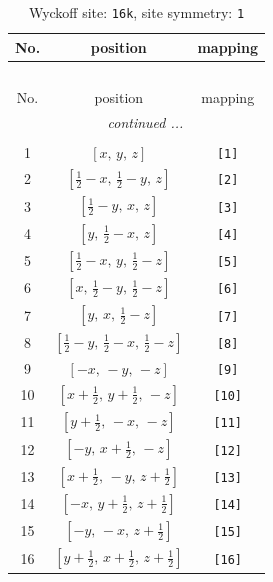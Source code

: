 \documentclass[fleqn,8pt]{jsarticle}
\begin{document}
\begin{longtable}{ccc}
\caption{Wyckoff site: {\tt 16k}, site symmetry: {\tt 1}}
 \\
 \hline \hline
No. & position & mapping \\ \hline \endfirsthead

\multicolumn{2}{l}{\tablename\ \thetable{}} \\
 \hline \hline
No. & position & mapping \\ \hline \endhead

 \hline \hline
\multicolumn{2}{r}{\footnotesize\it continued ...} \\ \endfoot

 \hline \hline
\multicolumn{2}{r}{} \\ \endlastfoot

1 & $\left[ x,\, y,\, z \right]$ & {\tt [1]} \\ \hline
2 & $\left[ \frac{1}{2} - x,\, \frac{1}{2} - y,\, z \right]$ & {\tt [2]} \\ \hline
3 & $\left[ \frac{1}{2} - y,\, x,\, z \right]$ & {\tt [3]} \\ \hline
4 & $\left[ y,\, \frac{1}{2} - x,\, z \right]$ & {\tt [4]} \\ \hline
5 & $\left[ \frac{1}{2} - x,\, y,\, \frac{1}{2} - z \right]$ & {\tt [5]} \\ \hline
6 & $\left[ x,\, \frac{1}{2} - y,\, \frac{1}{2} - z \right]$ & {\tt [6]} \\ \hline
7 & $\left[ y,\, x,\, \frac{1}{2} - z \right]$ & {\tt [7]} \\ \hline
8 & $\left[ \frac{1}{2} - y,\, \frac{1}{2} - x,\, \frac{1}{2} - z \right]$ & {\tt [8]} \\ \hline
9 & $\left[ - x,\, - y,\, - z \right]$ & {\tt [9]} \\ \hline
10 & $\left[ x + \frac{1}{2},\, y + \frac{1}{2},\, - z \right]$ & {\tt [10]} \\ \hline
11 & $\left[ y + \frac{1}{2},\, - x,\, - z \right]$ & {\tt [11]} \\ \hline
12 & $\left[ - y,\, x + \frac{1}{2},\, - z \right]$ & {\tt [12]} \\ \hline
13 & $\left[ x + \frac{1}{2},\, - y,\, z + \frac{1}{2} \right]$ & {\tt [13]} \\ \hline
14 & $\left[ - x,\, y + \frac{1}{2},\, z + \frac{1}{2} \right]$ & {\tt [14]} \\ \hline
15 & $\left[ - y,\, - x,\, z + \frac{1}{2} \right]$ & {\tt [15]} \\ \hline
16 & $\left[ y + \frac{1}{2},\, x + \frac{1}{2},\, z + \frac{1}{2} \right]$ & {\tt [16]} \\
\end{longtable}
\end{document}
